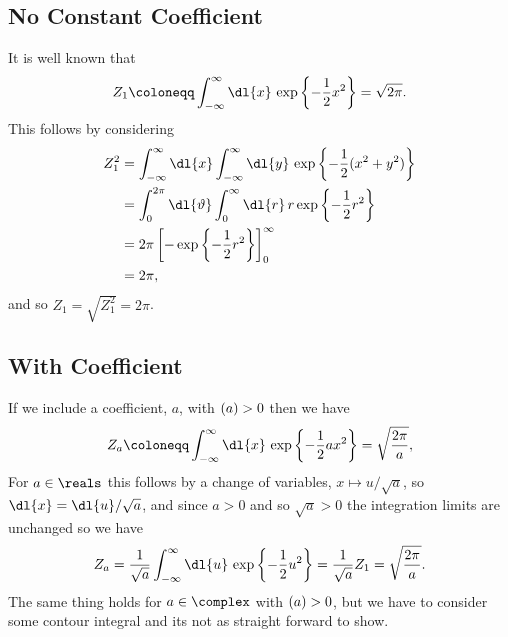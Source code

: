 \documentclass[fleqn]{NotesClass}
\let\Re\relax
\DeclareMathOperator{\Re}{Re}
\begin{document}
    \subsection{No Constant Coefficient}
    It is well known that
    \begin{equation}
        Z_{1} \coloneqq \int_{-\infty}^{\infty} \dl{x} \, \exp\left\{ -\frac{1}{2}x^2 \right\} = \sqrt{2\pi}.
    \end{equation}
    This follows by considering
    \begin{align}
        Z_{1}^2 &= \int_{-\infty}^{\infty} \dl{x} \int_{-\infty}^{\infty} \dl{y} \, \exp\left\{ -\frac{1}{2}(x^2 + y^2) \right\}\\
        &= \int_{0}^{2\pi} \dl{\vartheta} \int_{0}^{\infty} \dl{r} \, r \exp\left\{ -\frac{1}{2}r^2 \right\}\\
        &= 2\pi \left[ -\exp\left\{ -\frac{1}{2}r^2 \right\} \right]_{0}^{\infty}\\
        &= 2\pi,
    \end{align}
    and so \(Z_1 = \sqrt{Z_1^2} = 2\pi\).
    
    \subsection{With Coefficient}
    If we include a coefficient, \(a\), with \(\Re(a) > 0\) then we have
    \begin{equation}
        Z_a \coloneqq \int_{-\infty}^{\infty} \dl{x} \, \exp\left\{ -\frac{1}{2}ax^2 \right\} = \sqrt{\frac{2\pi}{a}},
    \end{equation}
    For \(a \in \reals\) this follows by a change of variables, \(x \mapsto u/\sqrt{a}\), so \(\dl{x} = \dl{u}/\sqrt{a}\), and since \(a > 0\) and so \(\sqrt{a} > 0\) the integration limits are unchanged so we have
    \begin{equation}
        Z_a = \frac{1}{\sqrt{a}} \int_{-\infty}^{\infty} \dl{u} \, \exp\left\{ -\frac{1}{2}u^2 \right\} = \frac{1}{\sqrt{a}} Z_1 = \sqrt{\frac{2\pi}{a}}.
    \end{equation}
    The same thing holds for \(a \in \complex\) with \(\Re(a) > 0\), but we have to consider some contour integral and its not as straight forward to show.
    
\end{document}
